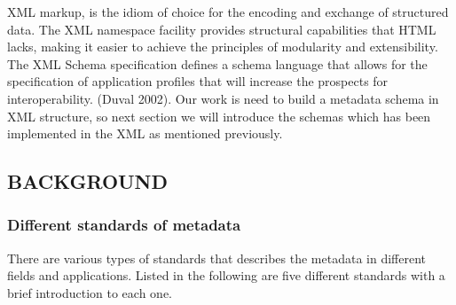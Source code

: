 XML markup, is the idiom of choice for the encoding and exchange of structured data. The XML namespace facility provides structural capabilities that HTML lacks, making it easier to achieve the principles of modularity and extensibility. The XML Schema specification defines a schema language that allows for the specification of application profiles that will increase the prospects for interoperability. (Duval 2002). Our work is need to build a metadata schema in XML structure, so next section we will introduce the schemas which has been implemented in the XML as mentioned previously.
\subsection{BACKGROUND}

\subsubsection{Different standards of metadata}
\label{sec:mets}
There are various types of standards that describes the metadata in different fields and applications. Listed in the following are five different standards with a brief introduction to each one.

